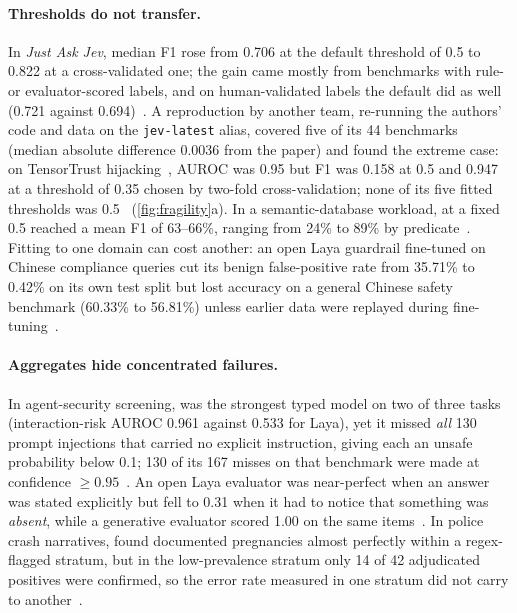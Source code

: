 \paragraph{Thresholds do not transfer.}
In \emph{Just Ask Jev}, median F1 rose from 0.706 at the default threshold of 0.5 to 0.822 at a cross-validated one; the gain came mostly from benchmarks with rule- or evaluator-scored labels, and on human-validated labels the default did as well (0.721 against 0.694)~\cite{arx29429}.
A reproduction by another team, re-running the authors' code and data on the \texttt{jev-latest} alias, covered five of its 44 benchmarks (median absolute difference 0.0036 from the paper) and found the extreme case: on TensorTrust hijacking~\cite{toyer2024tensor}, AUROC was 0.95 but F1 was 0.158 at 0.5 and 0.947 at a threshold of 0.35 chosen by two-fold cross-validation; none of its five fitted thresholds was 0.5~\cite{jkf87_2026replication}\gmark{} (\cref{fig:fragility}a).
In a semantic-database workload, \jev{} at a fixed 0.5 reached a mean F1 of 63--66\%, ranging from 24\% to 89\% by predicate~\cite{arx02046}.
Fitting to one domain can cost another: an open Laya guardrail fine-tuned on Chinese compliance queries cut its benign false-positive rate from 35.71\% to 0.42\% on its own test split but lost accuracy on a general Chinese safety benchmark (60.33\% to 56.81\%) unless earlier data were replayed during fine-tuning~\cite{arx33671}.

\paragraph{Aggregates hide concentrated failures.}
In agent-security screening, \jev{} was the strongest typed model on two of three tasks (interaction-risk AUROC 0.961 against 0.533 for Laya), yet it missed \emph{all} 130 prompt injections that carried no explicit instruction, giving each an unsafe probability below 0.1; 130 of its 167 misses on that benchmark were made at confidence $\geq 0.95$~\cite{arx33401}.
An open Laya evaluator was near-perfect when an answer was stated explicitly but fell to 0.31 when it had to notice that something was \emph{absent}, while a generative evaluator scored 1.00 on the same items~\cite{zen22901853}\zmark{}.
In police crash narratives, \jev{} found documented pregnancies almost perfectly within a regex-flagged stratum, but in the low-prevalence stratum only 14 of 42 adjudicated positives were confirmed, so the error rate measured in one stratum did not carry to another~\cite{arx00213}.

